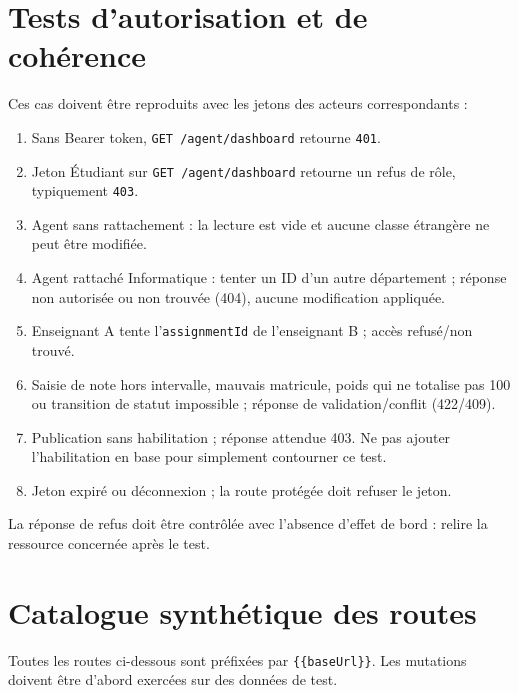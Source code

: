 \documentclass[10pt,a4paper]{article}
\begin{document}
\section{Tests d’autorisation et de cohérence}

Ces cas doivent être reproduits avec les jetons des acteurs correspondants :
\begin{enumerate}
\item Sans Bearer token, \texttt{GET /agent/dashboard} retourne \texttt{401}.
\item Jeton Étudiant sur \texttt{GET /agent/dashboard} retourne un refus de rôle, typiquement \texttt{403}.
\item Agent sans rattachement : la lecture est vide et aucune classe étrangère ne peut être modifiée.
\item Agent rattaché Informatique : tenter un ID d’un autre département ; réponse non autorisée ou non trouvée (404), aucune modification appliquée.
\item Enseignant A tente l’\texttt{assignmentId} de l’enseignant B ; accès refusé/non trouvé.
\item Saisie de note hors intervalle, mauvais matricule, poids qui ne totalise pas 100 ou transition de statut impossible ; réponse de validation/conflit (422/409).
\item Publication sans habilitation ; réponse attendue 403. Ne pas ajouter l’habilitation en base pour simplement contourner ce test.
\item Jeton expiré ou déconnexion ; la route protégée doit refuser le jeton.
\end{enumerate}

La réponse de refus doit être contrôlée avec l’absence d’effet de bord : relire la ressource concernée après le test.

\section{Catalogue synthétique des routes}

Toutes les routes ci-dessous sont préfixées par \texttt{\{\{baseUrl\}\}}. Les mutations doivent être d’abord exercées sur des données de test.
\end{document}
